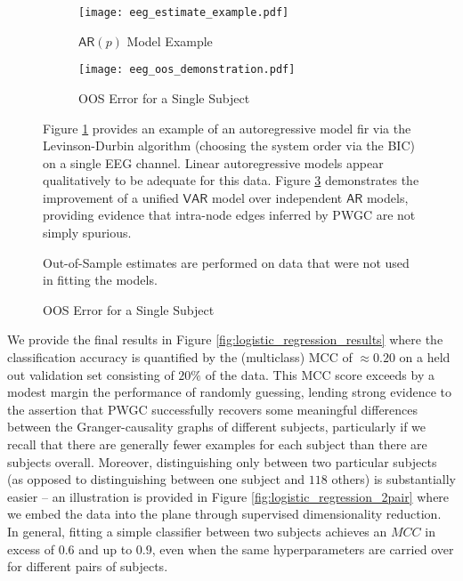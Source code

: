 \documentclass[12pt]{article}
\def\VAR{\mathsf{VAR}}  %
\begin{document}
\begin{figure}
  \centering
  \begin{subfigure}[b]{0.45\textwidth}
    \caption{$\mathsf{AR}(p)$ Model Example}
    \label{fig:ar_eeg_example}
    \texttt{[image: eeg\_estimate\_example.pdf]}
  \end{subfigure}
  \begin{subfigure}[b]{0.45\textwidth}
    \caption{OOS Error for a Single Subject}
    \label{fig:eeg_oos_error}
    \texttt{[image: eeg\_oos\_demonstration.pdf]}
  \end{subfigure}

  {\scriptsize Figure \ref{fig:ar_eeg_example} provides an example of
    an autoregressive model fir via the Levinson-Durbin algorithm
    (choosing the system order via the BIC) on a single EEG channel.
    Linear autoregressive models appear qualitatively to be adequate
    for this data.  Figure \ref{fig:eeg_oos_error} demonstrates the
    improvement of a unified $\VAR$ model over independent
    $\mathsf{AR}$ models, providing evidence that intra-node edges
    inferred by PWGC are not simply spurious.

  Out-of-Sample estimates are performed on data that were not used in
  fitting the models.}
\end{figure}

We provide the final results in Figure
\ref{fig:logistic_regression_results} where the classification
accuracy is quantified by the (multiclass) MCC of $\approx 0.20$ on a held
out validation set consisting of $20\%$ of the data.  This MCC score
exceeds by a modest margin the performance of randomly guessing,
lending strong evidence to the assertion that PWGC successfully
recovers some meaningful differences between the Granger-causality
graphs of different subjects, particularly if we recall that there are
generally fewer examples for each subject than there are subjects
overall.  Moreover, distinguishing only between two particular
subjects (as opposed to distinguishing between one subject and $118$
others) is substantially easier -- an illustration is provided in
Figure \ref{fig:logistic_regression_2pair} where we embed the data
into the plane through supervised dimensionality reduction.  In
general, fitting a simple classifier between two subjects achieves an
$MCC$ in excess of $0.6$ and up to $0.9$, even when the same
hyperparameters are carried over for different pairs of subjects.
\end{document}
